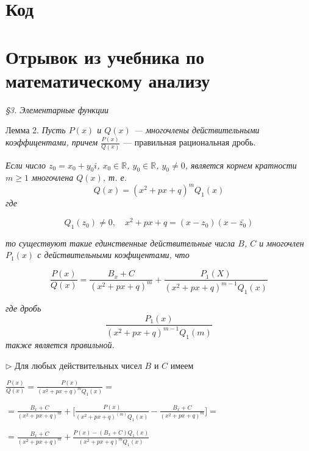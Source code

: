 \section{Код}



\newpage
\section{Отрывок из учебника по математическому анализу \cite{math_analiz}}
\begin{center}
\textit{\S 3. Элементарные функции}
\end{center}
\hspace{0.5cm} Лемма 2. \textit{Пусть $P(x)$ и $Q(x)$ --- многочлены действительными коэффицентами, причем} $\frac{P(x)}{Q(x)}$ --- правильная рациональная дробь. \par
\indent \textit{Если число $z_0 = x_0 + y_0i$, $x_0 \in \mathbb{R}$, $y_0 \in \mathbb{R}$,
 $y_0 \neq 0$, является корнем кратности $m \geq 1$ многочлена $Q(x)$, т. е.}
\begin{equation}  
    \label{eq:1}
    Q(x) = (x^2+px+q)^mQ_1(x)
\end{equation}
\textit{где}

\begin{equation}  
    \label{eq:2}
    Q_1(z_0) \neq 0,\quad x^2 +px + q = (x-z_0)(x-\bar{z_0})
\end{equation}

\textit{то существуют такие единственные действительные числа $B$, $C$
и многочлен $P_1(x)$ с действительными коэфицентами, что }

\begin{equation}
    \label{eq:3}
    \frac{P(x)}{Q(x)}=\frac{B_x+C}{(x^2+px+q)^m}+\frac{P_1(X)}{(x^2+px+q)^{m-1}Q_1(x)}
\end{equation}

\textit{где дробь}
\begin{equation}
    \label{eq:4}
    \frac{P_1(x)}{(x^2+px+q)^{m-1}Q_1(m)}
\end{equation}
\textit{также является правильной.} \par

\noindent $\triangleright$ Для любых действительных чисел $B$ и $C$ имеем \par
\noindent $\frac{P(x)}{Q(x)}=\frac{P(x)}{(x^2+px+q)^mQ_1(x)}=$ \par
$=\frac{B_x+C}{(x^2+px+q)^m} + 
\Biggl[\frac{P(x)}{(x^2+px+q)^(m)Q_1(x)} - \frac{B_x+C}{(x^2+px+q)^m} \Biggr] =$ \par
\hspace{2.5cm} $= \frac{B_x+C}{(x^2+px+q)^m}+\frac{P(x)-(B_x+C)Q_1(x)}{(x^2+px+q)^mQ_1(x)}$ 
\par

